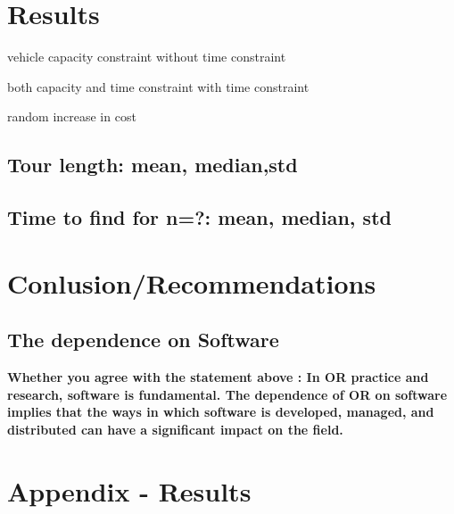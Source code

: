 \documentclass[a4paper,11pt]{article}
\begin{document}
\section{Results}

vehicle capacity constraint without time constraint

both capacity and time constraint with time constraint

random increase in cost

\subsection{Tour length: mean, median,std}

\subsection{Time to find for n=?: mean, median, std}

\section{Conlusion/Recommendations}

\subsection{The dependence on Software}
\textbf{Whether you agree with the statement above : In OR practice and research, software is fundamental. The dependence
of OR on software implies that the ways in which software is developed, managed, and distributed can
have a significant impact on the field.}

























\clearpage
\section*{Appendix - Results}



\begin{lstlisting}

\end{lstlisting}
\end{document}
